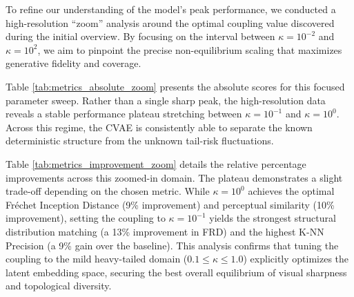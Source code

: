 \documentclass[twoside,11pt]{article}
\begin{document}
To refine our understanding of the model's peak performance, we conducted a high-resolution ``zoom'' analysis around the optimal coupling value discovered during the initial overview. By focusing on the interval between $\kappa=10^{-2}$ and $\kappa=10^{2}$, we aim to pinpoint the precise non-equilibrium scaling that maximizes generative fidelity and coverage. 

Table \ref{tab:metrics_absolute_zoom} presents the absolute scores for this focused parameter sweep. Rather than a single sharp peak, the high-resolution data reveals a stable performance plateau stretching between $\kappa = 10^{-1}$ and $\kappa = 10^{0}$. Across this regime, the CVAE is consistently able to separate the known deterministic structure from the unknown tail-risk fluctuations. 

Table \ref{tab:metrics_improvement_zoom} details the relative percentage improvements across this zoomed-in domain. The plateau demonstrates a slight trade-off depending on the chosen metric. While $\kappa = 10^{0}$ achieves the optimal Fréchet Inception Distance (9\% improvement) and perceptual similarity (10\% improvement), setting the coupling to $\kappa = 10^{-1}$ yields the strongest structural distribution matching (a 13\% improvement in FRD) and the highest K-NN Precision (a 9\% gain over the baseline). This analysis confirms that tuning the coupling to the mild heavy-tailed domain ($0.1 \le \kappa \le 1.0$) explicitly optimizes the latent embedding space, securing the best overall equilibrium of visual sharpness and topological diversity.
\end{document}
